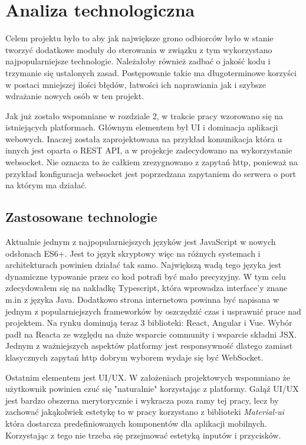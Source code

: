 \chapter{Analiza technologiczna}
Celem projektu było to aby jak największe grono odbiorców było w stanie tworzyć dodatkowe moduły do sterowania w związku z tym wykorzystano najpopularniejsze technologie. Należałoby również zadbać o jakość kodu i trzymanie się ustalonych zasad. Postępowanie takie ma długoterminowe korzyści w postaci mniejszej ilości błędów, łatwości ich naprawiania jak i szybsze wdrażanie nowych osób w ten projekt. 
\par Jak już zostało wspomniane w rozdziale 2, w trakcie pracy wzorowano się na istniejących platformach. Głównym elementem był UI i dominacja aplikacji webowych. Inaczej została zaprojektowana na przykład komunikacja która u innych jest oparta o REST API, a w projekcje zadecydowano na wykorzystanie websocket. Nie oznacza to że całkiem zrezygnowano z zapytań http, ponieważ na przykład konfiguracja websocket jest poprzedzana zapytaniem do serwera o port na którym ma działać.
\section{Zastosowane technologie}
Aktualnie jednym z najpopularniejszych języków jest JavaScript w nowych odsłonach ES6+. Jest to język skryptowy więc na różnych systemach i architekturach powinien działać tak samo. Największą wadą tego języka jest dynamiczne typowanie przez co kod potrafi być mało precyzyjny. W tym celu zdecydowałem się na nakładkę Typescript, która wprowadza interface'y znane m.in z języka Java. Dodatkowo strona internetowa powinna być napisana w jednym z popularniejszych frameworków by oszczędzić czas i usprawnić prace nad projektem. Na rynku dominują teraz 3 biblioteki: React, Angular i Vue. Wybór padł na Reacta ze względu na duże wsparcie community i wsparcie składni JSX. \\
Jednym z ważniejszych aspektów platformy jest responsywność dlatego zamiast klasycznych zapytań http dobrym wyborem wydaje się być WebSocket. 
\par Ostatnim elementem jest UI/UX. W założeniach projektowych wspomniano że użytkownik powinien czuć się "naturalnie" korzystając z platformy. Gałąź UI/UX jest bardzo obszerna merytorycznie i wykracza poza ramy tej pracy, lecz by zachować jakąkolwiek estetykę to w pracy korzystano z biblioteki \textit{Material-ui} która dostarcza predefiniowanych komponentów dla aplikacji mobilnych. Korzystając z tego nie trzeba się przejmować estetyką inputów i przycisków. 
